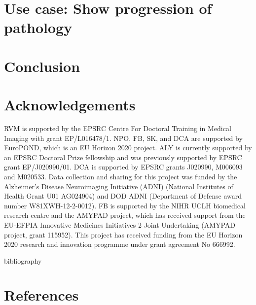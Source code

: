 \documentclass[final,5p,times,twocolumn,authoryear]{elsarticle}
\begin{document}
\FloatBarrier
\section{Use case: Show progression of pathology}
\label{design}


\section{Conclusion} 




\FloatBarrier
\section{Acknowledgements}




RVM is supported by the EPSRC Centre For Doctoral Training in Medical Imaging with grant EP/L016478/1. NPO, FB, SK, and DCA are supported by EuroPOND, which is an EU Horizon 2020 project. ALY is currently supported by an EPSRC Doctoral Prize fellowship and was previously supported by EPSRC grant EP/J020990/01. DCA is supported by EPSRC grants J020990, M006093 and M020533. Data collection and sharing for this project was funded by the Alzheimer's Disease Neuroimaging Initiative (ADNI) (National Institutes of Health Grant U01 AG024904) and DOD ADNI (Department of Defense award number W81XWH-12-2-0012). FB is supported by the NIHR UCLH biomedical research centre and the AMYPAD project, which has received support from the EU-EFPIA Innovative Medicines Initiatives 2 Joint Undertaking (AMYPAD project, grant 115952). This project has received funding from the EU Horizon 2020 research and innovation programme under grant agreement No 666992.

bibliography





\section*{References}






\printbibliography
\end{document}
